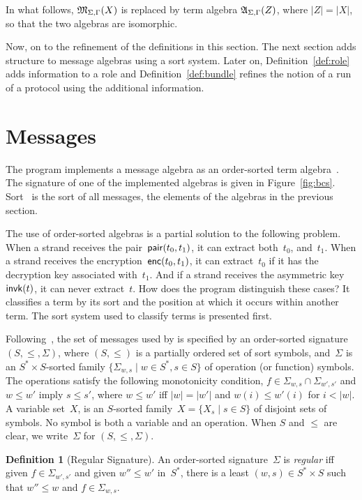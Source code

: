 \documentclass[12pt]{article}
\theoremstyle{definition}
\newtheorem{defn}{Definition}[section]
\begin{document}
In what follows, $\mathfrak M_{\Sigma,\Gamma}(X)$ is replaced by term algebra
$\mathfrak A_{\Sigma,\Gamma}(Z)$, where $|Z|=|X|$, so that the two
algebras are isomorphic.

Now, on to the refinement of the definitions in this section.  The
next section adds structure to message algebras using a sort system.
Later on, Definition~\ref{def:role} adds information to a role
and Definition~\ref{def:bundle} refines the notion of a run of a
protocol using the additional information.

\section{Messages}\label{sec:messages}

The {\cpsa} program implements a message algebra as an order-sorted term
algebra~\cite{GoguenMeseguer92}.  The signature of one of the
implemented algebras is given in Figure~\ref{fig:bcs}.
Sort~ is the sort of all messages, the elements of the
algebras in the previous section.

The use of order-sorted algebras is a partial solution to the
following problem.  When a strand receives the
pair~$\operatorname{\mathsf{pair}}(t_0,t_1)$, it can extract both~$t_0$, and~$t_1$.  When
a strand receives the encryption~$\operatorname{\mathsf{enc}}(t_0,t_1)$, it can
extract~$t_0$ if it has the decryption key associated with~$t_1$.  And
if a strand receives the asymmetric key $\operatorname{\mathsf{invk}}(t)$, it can never
extract~$t$.  How does the {\cpsa} program distinguish these cases?
It classifies a term by its sort and the position at which it occurs
within another term.  The sort system used to classify terms is
presented first.

Following~\cite{GoguenMeseguer92}, the set of messages used by {\cpsa}
is specified by an order-sorted signature $(S, \leq, \Sigma)$, where
$(S,\leq)$ is a partially ordered set of sort symbols, and~$\Sigma$ is
an $S^\ast\times S$-sorted family $\{\Sigma_{w,s}\mid w\in S^\ast,
s\in S\}$ of operation (or function) symbols.  The operations satisfy
the following monotonicity condition,
$f\in\Sigma_{w,s}\cap\Sigma_{w',s'}$ and $w\leq w'$ imply $s\leq s'$,
where $w\leq w'$ iff $|w|=|w'|$ and $w(i)\leq w'(i)$ for $i<|w|$.  A
variable set~$X$, is an $S$-sorted
family~$X=\{X_s\mid s\in S\}$ of disjoint sets of symbols.  No symbol
is both a variable and an operation.  When $S$ and $\leq$ are clear,
we write~$\Sigma$ for $(S,\leq,\Sigma)$.

\begin{defn}[Regular Signature]
An order-sorted signature~$\Sigma$ is \emph{regular} iff given
$f\in\Sigma_{w',s'}$ and given $w''\leq w'$ in~$S^\ast$, there is a
least $(w,s)\in S^\ast\times S$ such that $w''\leq w$ and
$f\in\Sigma_{w,s}$.
\end{defn}
\end{document}

